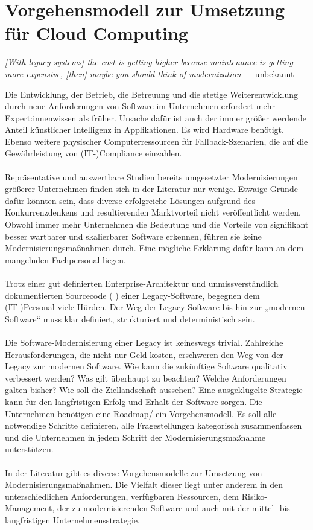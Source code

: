 \section{Vorgehensmodell zur Umsetzung für Cloud Computing}
\label{VgmVorgehensmodell}
\begin{flushright}{\slshape    
    [With legacy systems] the cost is getting higher because maintenance is getting more expensive, [then] maybe you should think of modernization}
    --- unbekannt \cite{profperLeg}
\end{flushright}

Die Entwicklung, der Betrieb, die Betreuung und die stetige Weiterentwicklung durch neue Anforderungen von  Software im Unternehmen erfordert  mehr Expert:innenwissen als früher. Ursache dafür ist auch der immer größer werdende Anteil künstlicher Intelligenz in Applikationen. Es wird Hardware benötigt. Ebenso weitere physischer Computerressourcen für Fallback-Szenarien, die auf die Gewährleistung von (IT-)Compliance einzahlen.
\\\\
Repräsentative und auswertbare Studien bereits umgesetzter Modernisierungen größerer Unternehmen finden sich in der Literatur nur wenige. Etwaige Gründe dafür könnten sein, dass diverse erfolgreiche Lösungen aufgrund des Konkurrenzdenkens und resultierenden Marktvorteil nicht veröffentlicht werden.  Obwohl immer mehr Unternehmen die Bedeutung und die Vorteile von signifikant besser wartbarer und skalierbarer Software erkennen, führen sie keine Modernisierungsmaßnahmen durch. Eine mögliche Erklärung dafür kann an dem mangelnden Fachpersonal liegen.  \\\\

Trotz einer gut definierten Enterprise-Architektur und unmissverständlich dokumentierten Sourcecode ( ) einer Legacy-Software, begegnen dem (IT-)Personal viele Hürden. Der Weg der Legacy Software bis hin zur „modernen Software“ muss klar definiert, strukturiert und deterministisch sein. \\\\
Die Software-Modernisierung einer Legacy ist keineswegs trivial. Zahlreiche Herausforderungen, die nicht nur Geld kosten, erschweren den Weg von der Legacy zur modernen Software. Wie kann die zukünftige Software qualitativ verbessert werden?  Was  gilt überhaupt zu beachten? Welche Anforderungen galten bisher? Wie soll die Ziellandschaft aussehen? Eine ausgeklügelte Strategie kann für den langfristigen  Erfolg und Erhalt der Software sorgen.  Die Unternehmen benötigen eine Roadmap/ ein Vorgehensmodell. Es soll alle notwendige Schritte definieren, alle Fragestellungen kategorisch zusammenfassen und die Unternehmen in jedem Schritt der Modernisierungsmaßnahme unterstützen. 
\\\\
In der Literatur gibt es diverse Vorgehensmodelle zur Umsetzung von Modernisierungsmaßnahmen. Die Vielfalt dieser liegt unter anderem in den unterschiedlichen Anforderungen, verfügbaren Ressourcen, dem Risiko-Management, der zu modernisierenden Software und auch mit der mittel- bis langfristigen Unternehmensstrategie. \cite{10.1145/2818567.2818579}

